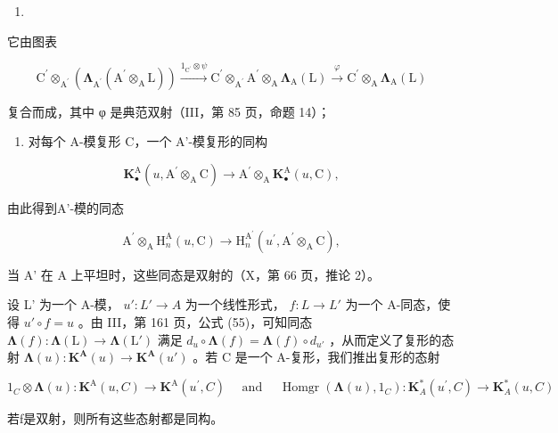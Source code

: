 \begin{enumerate}
\def\labelenumi{(\arabic{enumi})}
\setcounter{enumi}{8}
\tightlist
\item
\end{enumerate}

它由图表

\[
\mathrm{C} ^ {\prime} \otimes_ {\mathrm{A} ^ {\prime}} \left(\boldsymbol {\Lambda} _ {\mathrm{A} ^ {\prime}} \left(\mathrm{A} ^ {\prime} \otimes_ {\mathrm{A}} \mathrm{L}\right)\right) \xrightarrow {1 _ {\mathrm{C} ^ {\prime}} \otimes \psi} \mathrm{C} ^ {\prime} \otimes_ {\mathrm{A} ^ {\prime}} \mathrm{A} ^ {\prime} \otimes_ {\mathrm{A}} \boldsymbol {\Lambda} _ {\mathrm{A}} (\mathrm{L}) \xrightarrow {\varphi} \mathrm{C} ^ {\prime} \otimes_ {\mathrm{A}} \boldsymbol {\Lambda} _ {\mathrm{A}} (\mathrm{L})
\]

复合而成，其中 φ 是典范双射（III，第 85 页，命题 14）；

\begin{enumerate}
\def\labelenumi{\arabic{enumi})}
\setcounter{enumi}{1}
\tightlist
\item
  对每个 A-模复形 C，一个 A'-模复形的同构
\end{enumerate}

\[
\mathbf {K} _ {\bullet} ^ {\mathrm{A}} (u, \mathrm{A} ^ {\prime} \otimes_ {\mathrm{A}} \mathrm{C}) \rightarrow \mathrm{A} ^ {\prime} \otimes_ {\mathrm{A}} \mathbf {K} _ {\bullet} ^ {\mathrm{A}} (u, \mathrm{C}),
\]

由此得到A'-模的同态

\[
\mathrm{A} ^ {\prime} \otimes_ {\mathrm{A}} \mathrm{H} _ {n} ^ {\mathrm{A}} (u, \mathrm{C}) \rightarrow \mathrm{H} _ {n} ^ {\mathrm{A} ^ {\prime}} (u ^ {\prime}, \mathrm{A} ^ {\prime} \otimes_ {\mathrm{A}} \mathrm{C}),
\]

当 A' 在 A 上平坦时，这些同态是双射的（X，第 66 页，推论 2）。

设 L' 为一个 A-模， \(u': L' \to A\) 为一个线性形式， \(f: L \to L'\) 为一个 A-同态，使得 \(u' \circ f = u\) 。由 III，第 161 页，公式 (55)，可知同态 \(\symbf{\Lambda}(f): \symbf{\Lambda}(\mathrm{L}) \to \symbf{\Lambda}(\mathrm{L}')\) 满足 \(d_u \circ \symbf{\Lambda}(f) = \symbf{\Lambda}(f) \circ d_{u'}\) ，从而定义了复形的态射 \(\symbf{\Lambda}(u): \mathbf{K}^{\mathbf{A}}(u) \to \mathbf{K}^{\mathbf{A}}(u')\) 。若 C 是一个 A-复形，我们推出复形的态射

\[
1 _ {C} \otimes \boldsymbol {\Lambda} (u): \mathbf {K} ^ {\mathrm{A}} (u, C) \rightarrow \mathbf {K} ^ {\mathrm{A}} \left(u ^ {\prime}, C\right) \quad \text { and }\quad \operatorname{Homgr} \left(\boldsymbol {\Lambda} (u), 1 _ {C}\right): \mathbf {K} _ {A} ^ {*} \left(u ^ {\prime}, C\right)\rightarrow \mathbf {K} _ {A} ^ {*} (u, C)
\]

若f是双射，则所有这些态射都是同构。

